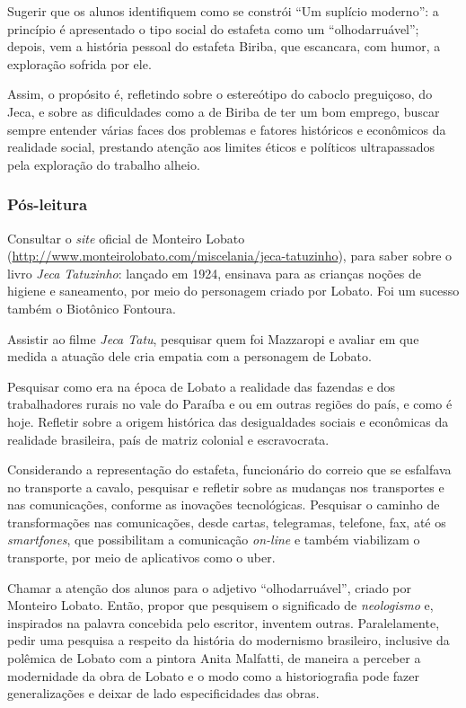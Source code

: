 \documentclass[11pt]{extarticle}
\begin{document}
Sugerir que os alunos identifiquem como se constrói ``Um suplício
moderno'': a princípio é apresentado o tipo social do estafeta como um
``olhodarruável''; depois, vem a história pessoal do estafeta Biriba,
que escancara, com humor, a exploração sofrida por ele.

Assim, o propósito é, refletindo sobre o estereótipo do caboclo
preguiçoso, do Jeca, e sobre as dificuldades como a de Biriba de ter um
bom emprego, buscar sempre entender várias faces dos problemas e fatores
históricos e econômicos da realidade social, prestando atenção aos
limites éticos e políticos ultrapassados pela exploração do trabalho
alheio.

\subsubsection{Pós-leitura}

Consultar o \emph{site} oficial de Monteiro Lobato
(\url{http://www.monteirolobato.com/miscelania/jeca-tatuzinho}), para
saber sobre o livro \emph{Jeca Tatuzinho}: lançado em 1924, ensinava
para as crianças noções de higiene e saneamento, por meio do personagem
criado por Lobato. Foi um sucesso também o Biotônico Fontoura.

Assistir ao filme \emph{Jeca Tatu}, pesquisar quem foi Mazzaropi e
avaliar em que medida a atuação dele cria empatia com a personagem de
Lobato.


Pesquisar como era na época de Lobato a realidade das fazendas e dos
trabalhadores rurais no vale do Paraíba e ou em outras regiões do país,
e como é hoje. Refletir sobre a origem histórica das desigualdades
sociais e econômicas da realidade brasileira, país de matriz colonial e
escravocrata.

Considerando a representação do estafeta, funcionário do correio que se
esfalfava no transporte a cavalo, pesquisar e refletir sobre as mudanças
nos transportes e nas comunicações, conforme as inovações tecnológicas.
Pesquisar o caminho de transformações nas comunicações, desde cartas,
telegramas, telefone, fax, até os \emph{smartfones}, que possibilitam a
comunicação \emph{on-line} e também viabilizam o transporte, por meio de
aplicativos como o uber.

Chamar a atenção dos alunos para o adjetivo ``olhodarruável'', criado
por Monteiro Lobato. Então, propor que pesquisem o significado de
\emph{neologismo} e, inspirados na palavra concebida pelo escritor,
inventem outras. Paralelamente, pedir uma pesquisa a respeito da
história do modernismo brasileiro, inclusive da polêmica de Lobato com a
pintora Anita Malfatti, de maneira a perceber a modernidade da obra de
Lobato e o modo como a historiografia pode fazer generalizações e deixar
de lado especificidades das obras.
\end{document}
